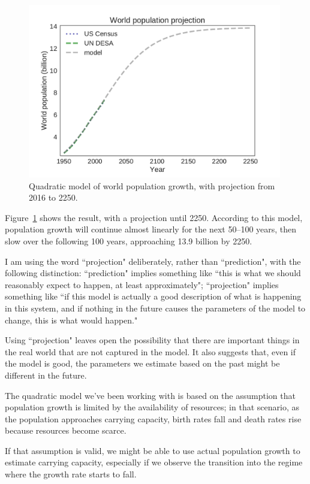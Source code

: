 \documentclass[12pt]{book}
\theoremstyle{exercise}
\begin{document}
\begin{figure}
\centerline{\includegraphics[height=3in]{figs/chap04-fig01.pdf}}
\caption{Quadratic model of world population growth, with projection from 2016 to 2250.}
\label{chap04-fig01}
\end{figure}

Figure~\ref{chap04-fig01} shows the result, with a projection until 2250.  According to this model, population growth will continue almost linearly for the next 50--100 years, then slow over the following 100 years, approaching 13.9 billion by 2250.

I am using the word ``projection" deliberately, rather than ``prediction", with the following distinction: ``prediction" implies something like ``this is what we should reasonably expect to happen, at least approximately"; ``projection" implies something like ``if this model is actually a good description of what is happening in this system, and if nothing in the future causes the parameters of the model to change, this is what would happen."

Using ``projection" leaves open the possibility that there are important things in the real world that are not captured in the model.  It also suggests that, even if the model is good, the parameters we estimate based on the past might be different in the future.

The quadratic model we've been working with is based on the assumption that population growth is limited by the availability of resources; in that scenario, as the population approaches carrying capacity, birth rates fall and death rates rise because resources become scarce.

If that assumption is valid, we might be able to use actual population growth to estimate carrying capacity, especially if we observe the transition into the regime where the growth rate starts to fall.
\end{document}
